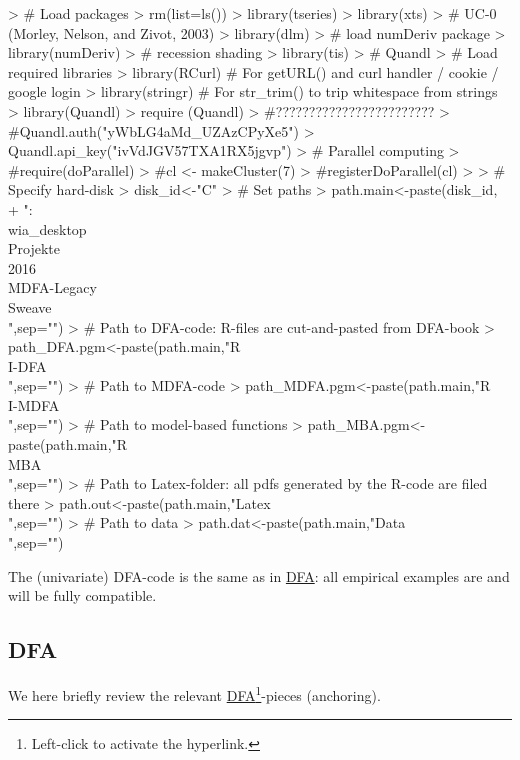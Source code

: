 \documentclass[a4paper]{book}
\begin{document}
\begin{Schunk}
\begin{Sinput}
> # Load packages
> rm(list=ls())
> library(tseries)
> library(xts)
> # UC-0 (Morley, Nelson, and Zivot, 2003)
> library(dlm)
> # load numDeriv package 
> library(numDeriv)
> # recession shading
> library(tis)  
> # Quandl
> # Load required libraries
> library(RCurl)    # For getURL() and curl handler / cookie / google login
> library(stringr)  # For str_trim() to trip whitespace from strings
> library(Quandl)
> require (Quandl)
> #????????????????????????
> #Quandl.auth("yWbLG4aMd_UZAzCPyXe5")
> Quandl.api_key("ivVdJGV57TXA1RX5jgvp")
> # Parallel computing
> #require(doParallel)
> #cl <- makeCluster(7)
> #registerDoParallel(cl)
> 
> # Specify hard-disk
> disk_id<-"C"
> # Set paths
> path.main<-paste(disk_id,
+       ":\\wia_desktop\\Projekte\\2016\\MDFA-Legacy\\Sweave\\",sep="")
> # Path to DFA-code: R-files are cut-and-pasted from DFA-book 
> path_DFA.pgm<-paste(path.main,"R\\I-DFA\\",sep="")
> # Path to MDFA-code
> path_MDFA.pgm<-paste(path.main,"R\\I-MDFA\\",sep="")
> # Path to model-based functions
> path_MBA.pgm<-paste(path.main,"R\\MBA\\",sep="")
> # Path to Latex-folder: all pdfs generated by the R-code are filed there
> path.out<-paste(path.main,"Latex\\",sep="")
> # Path to data 
> path.dat<-paste(path.main,"Data\\",sep="")
\end{Sinput}
\end{Schunk}
The (univariate) DFA-code is the same as in \href{http://blog.zhaw.ch/sef/files/2014/10/DFA.pdf}{DFA}: all  empirical examples are and will be fully compatible. 

\subsection{DFA}\label{dfa_intro}
We here briefly review the relevant \href{http://blog.zhaw.ch/sef/files/2014/10/DFA.pdf}{DFA}\footnote{Left-click to activate the hyperlink.}-pieces (anchoring). 
\end{document}

